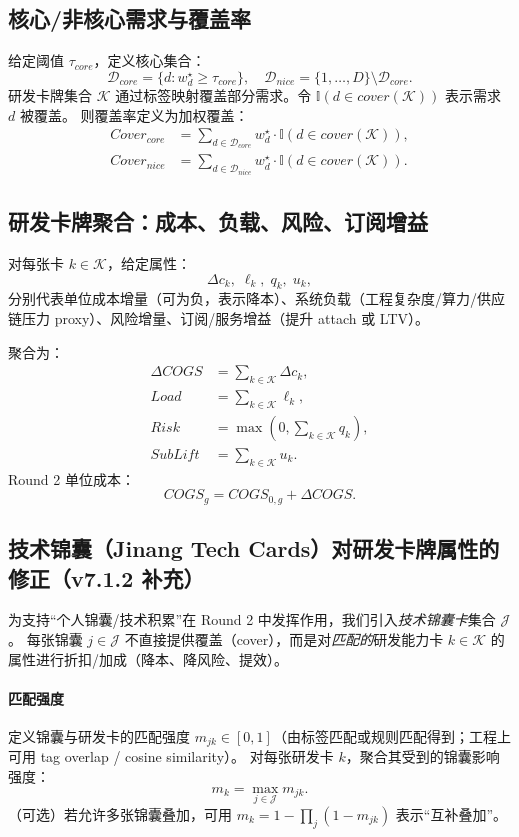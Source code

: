 \documentclass[UTF8,12pt]{ctexart}
\begin{document}
\subsection{核心/非核心需求与覆盖率}
给定阈值 $\tau_{core}$，定义核心集合：
\[
\mathcal{D}_{core}=\{d:w^{\star}_d\ge\tau_{core}\},\quad
\mathcal{D}_{nice}=\{1,\dots,D\}\setminus\mathcal{D}_{core}.
\]
研发卡牌集合 $\mathcal{K}$ 通过标签映射覆盖部分需求。令 $\mathbb{I}(d\in cover(\mathcal{K}))$ 表示需求 $d$ 被覆盖。
则覆盖率定义为加权覆盖：
\begin{align}
Cover_{core} &= \sum_{d\in\mathcal{D}_{core}} w^{\star}_d\cdot \mathbb{I}(d\in cover(\mathcal{K})),\\
Cover_{nice} &= \sum_{d\in\mathcal{D}_{nice}} w^{\star}_d\cdot \mathbb{I}(d\in cover(\mathcal{K})).
\end{align}

\subsection{研发卡牌聚合：成本、负载、风险、订阅增益}
对每张卡 $k\in\mathcal{K}$，给定属性：
\[
\Delta c_k,\;\ell_k,\;q_k,\;u_k,
\]
分别代表单位成本增量（可为负，表示降本）、系统负载（工程复杂度/算力/供应链压力 proxy）、风险增量、订阅/服务增益（提升 attach 或 LTV）。

聚合为：
\begin{align}
\Delta COGS &= \sum_{k\in\mathcal{K}} \Delta c_k,\\
Load &= \sum_{k\in\mathcal{K}} \ell_k,\\
Risk &= \max\left(0,\sum_{k\in\mathcal{K}} q_k\right),\\
SubLift &= \sum_{k\in\mathcal{K}} u_k.
\end{align}
Round 2 单位成本：
\begin{equation}
COGS_g = COGS_{0,g} + \Delta COGS.
\end{equation}


\subsection{技术锦囊（Jinang Tech Cards）对研发卡牌属性的修正（v7.1.2 补充）}
为支持“个人锦囊/技术积累”在 Round 2 中发挥作用，我们引入\emph{技术锦囊卡}集合 $\mathcal{J}$。
每张锦囊 $j\in\mathcal{J}$ 不直接提供覆盖（cover），而是对\emph{匹配的}研发能力卡 $k\in\mathcal{K}$ 的属性进行折扣/加成（降本、降风险、提效）。

\paragraph{匹配强度}
定义锦囊与研发卡的匹配强度 $m_{jk}\in[0,1]$（由标签匹配或规则匹配得到；工程上可用 tag overlap / cosine similarity）。
对每张研发卡 $k$，聚合其受到的锦囊影响强度：
\begin{equation}
m_k = \max_{j\in\mathcal{J}} m_{jk}.
\label{eq:jinang_match}
\end{equation}
（可选）若允许多张锦囊叠加，可用 $m_k = 1-\prod_{j}(1-m_{jk})$ 表示“互补叠加”。
\end{document}
